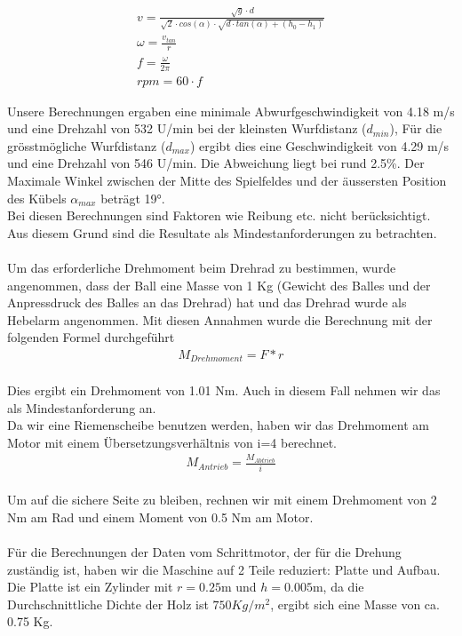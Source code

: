 \begin{gather}
	v=\frac{\sqrt{g} \cdot d}{\sqrt{2} \cdot cos(\alpha) \cdot \sqrt{d \cdot tan(\alpha)+(h_0-h_1)}}\\
	\omega=\frac{v_{tan}}{r}\\
	f=\frac{\omega}{2\pi}\\
	rpm=60 \cdot f
\end{gather}

Unsere Berechnungen ergaben eine minimale Abwurfgeschwindigkeit von 4.18 m/s und eine Drehzahl von 532 U/min bei der kleinsten Wurfdistanz ($d_{min}$), 
Für die grösstmögliche Wurfdistanz ($d_{max}$) ergibt dies  eine Geschwindigkeit von 4.29 m/s und eine Drehzahl von 546 U/min. 
Die Abweichung liegt bei rund 2.5\%.
Der Maximale Winkel zwischen der Mitte des Spielfeldes und der äussersten Position des Kübels $\alpha_{max}$ beträgt 19°. \\
Bei diesen Berechnungen sind Faktoren wie Reibung etc. nicht berücksichtigt. Aus diesem Grund sind die Resultate als Mindestanforderungen zu betrachten.\\ \\
Um das erforderliche Drehmoment beim Drehrad zu bestimmen, wurde angenommen, dass der Ball eine Masse von 1 Kg (Gewicht des Balles und der Anpressdruck des Balles an das Drehrad) hat und das Drehrad wurde als Hebelarm angenommen. Mit diesen Annahmen wurde die Berechnung mit der folgenden Formel durchgeführt\\
\begin{gather}
	M_{Drehmoment}=F*r
\end{gather}\\
Dies ergibt ein Drehmoment von 1.01 Nm. Auch in diesem Fall nehmen wir das als Mindestanforderung an.\\
Da wir eine Riemenscheibe benutzen werden, haben wir das Drehmoment am Motor mit einem Übersetzungsverhältnis von i=4 berechnet.\\
\begin{gather}
	M_{Antrieb}=\frac{M_{Abtrieb}}{i}
\end{gather}\\
Um auf die sichere Seite zu bleiben, rechnen wir mit einem Drehmoment von 2 Nm am Rad und einem Moment von 0.5 Nm am Motor.\\ \\
Für die Berechnungen der Daten vom Schrittmotor, der für die Drehung zuständig ist, haben wir die Maschine auf 2 Teile reduziert: Platte und Aufbau.
Die Platte ist ein Zylinder mit $r=0.25$m und $h=0.005$m, da die Durchschnittliche Dichte der Holz ist $750 Kg/m^2$, ergibt sich eine Masse von ca. 0.75 Kg.
